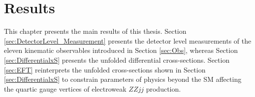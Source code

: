 \part {\LARGE{Results}}
\label{sec:Results}

This chapter presents the main results of this thesis. Section \ref{sec:DetectorLevel_Measurement} presents the detector level measurements of the eleven kinematic observables introduced in Section \ref{sec:Obs}, whereas Section \ref{sec:DifferentialxS} presents the unfolded differential cross-sections. Section \ref{sec:EFT} reinterprets the unfolded cross-sections shown in Section \ref{sec:DifferentialxS} to constrain parameters of physics beyond the SM affecting the quartic gauge vertices of electroweak $ZZjj$ production. 




